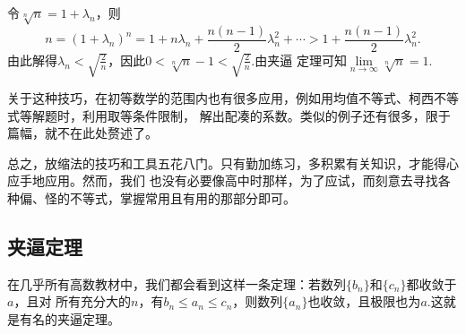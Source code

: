 \begin{enumerate}[label = \textbf{\arabic*.}]
\begin{prove}
              令$\sqrt[n]{n}=1+\lambda_n$，则
              \[
                  n=(1+\lambda_n)^n=1+n\lambda_n+\frac{n(n-1)}{2}\lambda^2 _n+\cdots >1+\frac{n(n-1)}{2}\lambda^2 _n
                  .\]
              由此解得$\lambda_n<\sqrt{\frac{2}{n}}$，因此$0<\sqrt[n]{n}-1<\sqrt{\frac{2}{n}}$.由夹逼
              定理可知$\lim\limits_{n \to \infty}\sqrt[n]{n}=1.$
          \end{prove}


          关于这种技巧，在初等数学的范围内也有很多应用，例如用均值不等式、柯西不等式等解题时，利用取等条件限制，
          解出配凑的系数。类似的例子还有很多，限于篇幅，就不在此处赘述了。


          总之，放缩法的技巧和工具五花八门。只有勤加练习，多积累有关知识，才能得心应手地应用。然而，我们
          也没有必要像高中时那样，为了应试，而刻意去寻找各种偏、怪的不等式，掌握常用且有用的那部分即可。
\end{enumerate}



\subsection{夹逼定理}
在几乎所有高数教材中，我们都会看到这样一条定理：若数列$\{ b_n \} $和$\{ c_n \} $都收敛于$a$，且对
所有充分大的$n$，有$b_n \leqslant a_n \leqslant c_n$，则数列$\{ a_n \} $也收敛，且极限也为$a$.这就是有名的夹逼定理。


